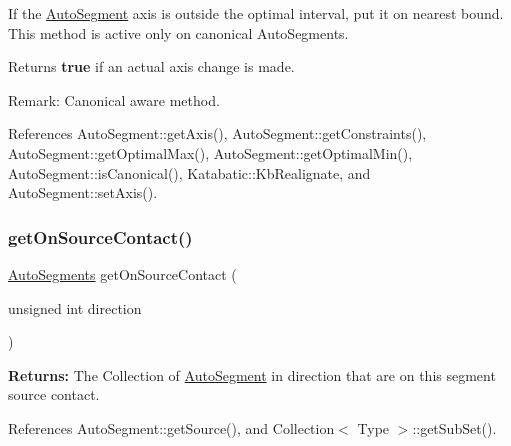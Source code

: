 If the \mbox{\hyperlink{classKatabatic_1_1AutoSegment}{Auto\+Segment}} axis is outside the optimal interval, put it on nearest bound. This method is active only on canonical Auto\+Segments.

\begin{DoxyReturn}{Returns}
{\bfseries true} if an actual axis change is made.
\end{DoxyReturn}
\begin{DoxyParagraph}{Remark\+: Canonical aware method. }

\end{DoxyParagraph}


References Auto\+Segment\+::get\+Axis(), Auto\+Segment\+::get\+Constraints(), Auto\+Segment\+::get\+Optimal\+Max(), Auto\+Segment\+::get\+Optimal\+Min(), Auto\+Segment\+::is\+Canonical(), Katabatic\+::\+Kb\+Realignate, and Auto\+Segment\+::set\+Axis().

\mbox{\label{classKatabatic_1_1AutoSegment_a4430f9704a59e1d4f7c37d7166649510}} 
\subsubsection{\texorpdfstring{get\+On\+Source\+Contact()}{getOnSourceContact()}}
{\footnotesize\ttfamily \mbox{\hyperlink{namespaceKatabatic_a2221b0ddbc24f331809fc86f98e38041}{Auto\+Segments}} get\+On\+Source\+Contact (\begin{DoxyParamCaption}\item[{unsigned int}]{direction }\end{DoxyParamCaption})}

{\bfseries Returns\+:} The Collection of \mbox{\hyperlink{classKatabatic_1_1AutoSegment}{Auto\+Segment}} in {\ttfamily direction} that are on this segment source contact. 

References Auto\+Segment\+::get\+Source(), and Collection$<$ Type $>$\+::get\+Sub\+Set().

\mbox{\label{classKatabatic_1_1AutoSegment_aadbb84c0f1383f6a2addc2661e388583}} 
